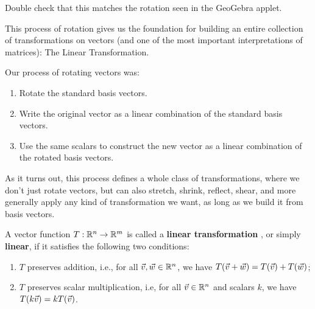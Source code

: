 \documentclass{ximera}
\begin{document}
\begin{exploration}
\begin{example}
        Double check that this matches the rotation seen in the GeoGebra applet.

    \end{example}

    \begin{remark}

        This process of rotation gives us the foundation for building an entire collection of transformations on vectors (and one of the most important interpretations of matrices): The Linear Transformation.

        Our process of rotating vectors was:

        \begin{enumerate}

            \item Rotate the standard basis vectors.
        
            \item Write the original vector as a linear combination of the standard basis vectors.
            
            \item Use the same scalars to construct the new vector as a linear combination of the rotated basis vectors.
            
        \end{enumerate}

        As it turns out, this process defines a whole class of transformations, where we don't just rotate vectors, but can also stretch, shrink, reflect, shear, and more generally apply any kind of transformation we want, as long as we build it from basis vectors.

        \begin{definition}
            A vector function $T:\mathbb{R}^n\to \mathbb{R}^m$ is called a \textbf{linear
              transformation}%
            , or simply \textbf{linear}, if it
            satisfies the following two conditions:
            \begin{enumerate}
            \item $T$ preserves addition, i.e., for all\/
              $\vec{v},\vec{w}\in\mathbb{R}^n$, we have
              $T(\vec{v}+\vec{w}) = T(\vec{v}) + T(\vec{w})$;
            \item $T$ preserves scalar multiplication, i.e, for all\/
              $\vec{v}\in\mathbb{R}^n$ and scalars $k$, we have
              $T(k\vec{v}) = kT(\vec{v})$.
            \end{enumerate}


\end{definition}
\end{remark}
\end{exploration}
\end{document}
